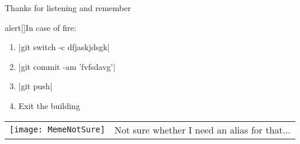 \documentclass[usenames,svgnames,14pt]{beamer}
\begin{document}
\begin{frame}{Thanks for listening and remember}
    \begin{varblock}{alert}[\textwidth]{In case of fire:}
        \begin{enumerate}
            \item \bash|git switch -c dfjaskjdsgk|
            \item \bash|git commit -am 'fvfsdavg'|
            \item \bash|git push|
            \item Exit the building
        \end{enumerate}
    \end{varblock}
    \vspace{3mm}
    \begin{tabular}{cc}
        \parbox[c]{3cm}{\texttt{[image: MemeNotSure]}} &
        Not sure whether I need an alias for that...\\
    \end{tabular}
    \vspace{5mm}
    \begin{center}
        \Large {}
    \end{center}
\end{frame}
\end{document}
